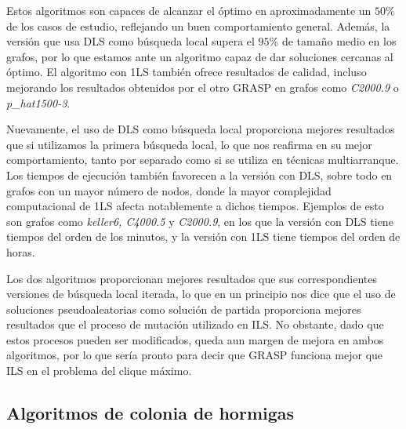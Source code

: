 Estos algoritmos son capaces de alcanzar el óptimo en aproximadamente un $50\%$ de
los casos de estudio, reflejando un buen comportamiento general. Además, la versión
que usa DLS como búsqueda local supera el $95\%$ de tamaño medio en los grafos, por
lo que estamos ante un algoritmo capaz de dar soluciones cercanas al óptimo.
El algoritmo con 1LS también ofrece resultados de calidad, incluso mejorando los
resultados obtenidos por el otro GRASP en grafos como \textit{C2000.9} o \textit{p\_hat1500-3}.

Nuevamente, el uso de DLS como búsqueda local proporciona mejores resultados que
si utilizamos la primera búsqueda local, lo que nos reafirma en su mejor comportamiento,
tanto por separado como si se utiliza en técnicas multiarranque. Los tiempos de
ejecución también favorecen a la versión con DLS, sobre todo en grafos con un mayor
número de nodos, donde la mayor complejidad computacional de 1LS afecta notablemente
a dichos tiempos. Ejemplos de esto son grafos como \textit{keller6, C4000.5} y \textit{C2000.9},
en los que la versión con DLS tiene tiempos del orden de los minutos, y la versión
con 1LS tiene tiempos del orden de horas.

Los dos algoritmos proporcionan mejores resultados que sus correspondientes versiones
de búsqueda local iterada, lo que en un principio nos dice que el uso de soluciones
pseudoaleatorias como solución de partida proporciona mejores resultados que el proceso
de mutación utilizado en ILS. No obstante, dado que estos procesos pueden ser modificados,
queda aun margen de mejora en ambos algoritmos, por lo que sería pronto para decir que
GRASP funciona mejor que ILS en el problema del clique máximo.

\subsection{Algoritmos de colonia de hormigas}

